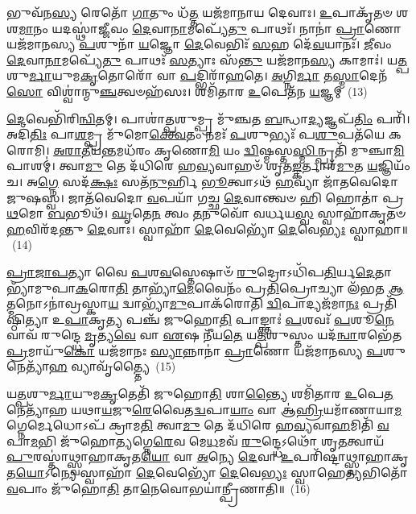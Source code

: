 𑌭𑍁𑌵᳴𑌨\-\ul{𑌸𑍍𑌯} 𑌰𑍇𑌤𑍋᳴ \ul{𑌗𑌾}\-𑌤𑍁𑌂 𑌧᳴\-\ul{𑌤𑍍𑌤} 𑌯𑌜᳴𑌮𑌾𑌨𑌾𑌯 𑌦𑍇𑌵𑌾𑌃। \ul{𑌉}\-𑌪𑌾𑌕𑍃᳴𑌤𑍞 𑌶𑌶\-\ul{𑌮𑌾}\-𑌨𑌂 𑌯𑌦𑌸𑍍𑌥𑌾॑\-\ul{𑌜𑍍𑌜𑍀}\-𑌵𑌂 \ul{𑌦𑍇}\-𑌵𑌾\-\ul{𑌨𑌾}\-𑌮𑌪𑍍𑌯𑍇᳴\-\ul{𑌤𑍁} 𑌪𑌾𑌥𑌃᳴। 𑌨𑌾𑌨𑌾॑ \ul{𑌪𑍍𑌰𑌾}\-𑌣𑍋 𑌯𑌜᳴𑌮𑌾𑌨𑌸𑍍𑌯 \ul{𑌪}\-𑌶𑍁𑌨𑌾᳴ \ul{𑌯}\-𑌜𑍍𑌞𑍋 \ul{𑌦𑍇}\-𑌵𑍇𑌭𑌿𑌃᳴ \ul{𑌸}\-𑌹 𑌦𑍇᳴\-\ul{𑌵}\-𑌯𑌾𑌨𑌃᳴। \ul{𑌜𑍀}\-𑌵𑌂 \ul{𑌦𑍇}\-𑌵𑌾\-\ul{𑌨𑌾}\-𑌮𑌪𑍍𑌯𑍇᳴\-\ul{𑌤𑍁} 𑌪𑌾𑌥𑌃᳴ \ul{𑌸}\-𑌤𑍍𑌯𑌾𑌃 𑌸᳴\-\ul{𑌨𑍍𑌤𑍁} 𑌯𑌜᳴𑌮𑌾𑌨\-\ul{𑌸𑍍𑌯} 𑌕𑌾𑌮𑌾𑌃॑। 𑌯\-\ul{𑌤𑍍𑌪}\-𑌶𑍁\-\ul{𑌰𑍍𑌮𑌾}\-𑌯𑍁𑌮\-\ul{𑌕𑍃}\-𑌤𑍋𑌰𑍋᳴ 𑌵𑌾 \ul{𑌪}\-𑌦𑍍𑌭𑌿𑌰𑌾᳴\-\ul{𑌹}\-𑌤𑍇। \ul{𑌅}\-𑌗𑍍𑌨𑌿\-\ul{𑌰𑍍𑌮𑌾} 𑌤\-\ul{𑌸𑍍𑌮𑌾}\-𑌦𑍇𑌨᳴\-\ul{𑌸𑍋} 𑌵𑌿𑌶𑍍𑌵𑌾॑𑌨𑍍𑌮𑍁\-\ul{𑌞𑍍𑌚}\-𑌤𑍍𑌵𑍞𑌹᳴𑌸𑌃। 𑌶𑌮𑌿᳴𑌤𑌾𑌰 \ul{𑌉}\-𑌪𑍇𑌤᳴𑌨 \ul{𑌯}\-𑌜𑍍𑌞𑌮𑍍~(13)

\-\ul{𑌦𑍇}\-𑌵𑍇𑌭𑌿᳴𑌰𑌿\-\ul{𑌨𑍍𑌵𑌿}\-𑌤𑌮𑍍। 𑌪𑌾𑌶𑌾॑\-\ul{𑌤𑍍𑌪}\-𑌶𑍁𑌮𑍍𑌪𑍍𑌰 𑌮𑍁᳴𑌞𑍍𑌚𑌤 \ul{𑌬}\-𑌨𑍍𑌧𑌾\-\ul{𑌦𑍍𑌯}\-𑌜𑍍𑌞𑌪᳴\-\ul{𑌤𑌿𑌂} 𑌪𑌰𑌿᳴। 𑌅𑌦𑌿᳴\-\ul{𑌤𑌿𑌃} 𑌪𑌾\-\ul{𑌶}\-𑌮𑍍𑌪𑍍𑌰 𑌮𑍁᳴𑌮𑍋\-\ul{𑌕𑍍𑌤𑍍𑌵𑍇}\-𑌤𑌂 𑌨𑌮𑌃᳴ \ul{𑌪}\-𑌶𑍁𑌭𑍍𑌯𑌃᳴ 𑌪\-\ul{𑌶𑍁}\-𑌪𑌤᳴𑌯𑍇 𑌕𑌰𑍋𑌮𑌿। \ul{𑌅}\-\-\ul{𑌰𑌾}\-\-\ul{𑌤𑍀}\-𑌯\-\ul{𑌨𑍍𑌤}\-𑌮𑌧᳴𑌰𑌂 𑌕𑍃𑌣𑍋\-\ul{𑌮𑌿} 𑌯𑌂 \ul{𑌦𑍍𑌵𑌿}\-𑌷𑍍𑌮𑌸𑍍𑌤\-\ul{𑌸𑍍𑌮𑌿}\-𑌨𑍍𑌪𑍍𑌰𑌤𑌿᳴ 𑌮𑍁𑌞𑍍𑌚𑌾\-\ul{𑌮𑌿} 𑌪𑌾𑌶𑌮𑍍॑। 𑌤𑍍𑌵𑌾\-\ul{𑌮𑍁} 𑌤𑍇 𑌦᳴𑌧𑌿𑌰𑍇 𑌹\-\ul{𑌵𑍍𑌯}\-𑌵𑌾𑌹𑍞᳴ 𑌶𑍃𑌤\-\ul{𑌙𑍍𑌕}\-𑌰𑍍𑌤𑌾𑌰᳴\-\ul{𑌮𑍁}\-𑌤 \ul{𑌯}\-𑌜𑍍𑌞𑌿𑌯𑌂᳴ 𑌚। 𑌅\-\ul{𑌗𑍍𑌨𑍇} 𑌸𑌦᳴\-\ul{𑌕𑍍𑌷𑌃} 𑌸𑌤᳴\-\ul{𑌨𑍁}\-𑌰𑍍\mbox{}𑌹𑌿 \ul{𑌭𑍂}\-𑌤𑍍𑌵𑌾\-𑌽𑌥᳴ \ul{𑌹}\-𑌵𑍍𑌯𑌾 𑌜𑌾᳴𑌤𑌵𑍇𑌦𑍋 𑌜𑍁𑌷𑌸𑍍𑌵। 𑌜𑌾𑌤᳴𑌵𑍇𑌦𑍋 \ul{𑌵}\-𑌪𑌯𑌾᳴ 𑌗𑌚𑍍𑌛 \ul{𑌦𑍇}\-𑌵𑌾𑌨𑍍𑌤𑍍𑌵𑍞 𑌹𑌿 𑌹𑍋𑌤𑌾॑ 𑌪𑍍𑌰\-\ul{𑌥}\-𑌮𑍋 \ul{𑌬}\-𑌭𑍂𑌥᳴। \ul{𑌘𑍃}\-𑌤𑍇\-\ul{𑌨} 𑌤𑍍𑌵𑌂 \ul{𑌤}\-𑌨𑍁𑌵𑍋᳴ 𑌵𑌰𑍍𑌧𑌯\-\ul{𑌸𑍍𑌵} 𑌸𑍍𑌵𑌾𑌹𑌾᳴𑌕𑍃𑌤𑍞 \ul{𑌹}\-𑌵𑌿𑌰᳴𑌦𑌨𑍍𑌤𑍁 \ul{𑌦𑍇}\-𑌵𑌾𑌃। 𑌸𑍍𑌵𑌾𑌹𑌾᳴ \ul{𑌦𑍇}\-𑌵𑍇𑌭𑍍𑌯𑍋᳴ \ul{𑌦𑍇}\-𑌵𑍇\-\ul{𑌭𑍍𑌯𑌃} 𑌸𑍍𑌵𑌾𑌹𑌾॑॥~(14)

{\anuvakamend[{𑌈𑌶𑍇॑ 𑌪𑍍𑌰\-\ul{𑌮𑍁}\-𑌞𑍍𑌚𑌮𑌾᳴𑌨𑌾 \ul{𑌯}\-𑌜𑍍𑌞𑌨𑍍𑌤𑍍𑌵𑍞 𑌷𑍋𑌡᳴𑌶 𑌚}]}%

\-\ul{𑌪𑍍𑌰𑌾}\-\-\ul{𑌜𑌾}\-\-\ul{𑌪}\-𑌤𑍍𑌯𑌾 𑌵𑍈 \ul{𑌪}\-𑌶\-\ul{𑌵}\-𑌸𑍍𑌤𑍇𑌷𑌾𑍞᳴ \ul{𑌰𑍁}\-𑌦𑍍𑌰𑍋\-𑌽𑌧𑌿᳴𑌪\-\ul{𑌤𑌿}\-𑌰𑍍𑌯\-\ul{𑌦𑍇}\-𑌤𑌾𑌭𑍍𑌯𑌾᳴𑌮𑍁𑌪𑌾\-\ul{𑌕}\-𑌰𑍋\-\ul{𑌤𑌿} 𑌤𑌾𑌭𑍍𑌯𑌾᳴\-\ul{𑌮𑍇}\-𑌵𑍈𑌨𑌂᳴ 𑌪𑍍𑌰\-\ul{𑌤𑌿}\-𑌪𑍍𑌰𑍋𑌚𑍍𑌯𑌾 𑌲᳴𑌭𑌤 \ul{𑌆}\-𑌤𑍍𑌮𑌨𑍋\-𑌽𑌨𑌾॑𑌵𑍍𑌰𑌸𑍍𑌕𑌾\-\ul{𑌯} 𑌦𑍍𑌵𑌾𑌭𑍍𑌯𑌾᳴\-\ul{𑌮𑍁}\-𑌪𑌾𑌕᳴𑌰𑍋𑌤𑌿 \ul{𑌦𑍍𑌵𑌿}\-𑌪𑌾𑌦𑍍𑌯𑌜᳴𑌮𑌾\-\ul{𑌨𑌃} 𑌪𑍍𑌰𑌤𑌿᳴𑌷𑍍𑌠𑌿𑌤𑍍𑌯𑌾 𑌉\-\ul{𑌪𑌾}\-𑌕𑍃\-\ul{𑌤𑍍𑌯} 𑌪𑌞𑍍𑌚᳴ 𑌜𑍁𑌹𑍋\-\ul{𑌤𑌿} 𑌪𑌾𑌙𑍍𑌕𑍍𑌤𑌾𑌃॑ \ul{𑌪}\-𑌶𑌵𑌃᳴ \ul{𑌪}\-𑌶𑍂\-\ul{𑌨𑍇}\-𑌵𑌾𑌵᳴ 𑌰𑍁𑌨𑍍𑌦𑍍𑌧𑍇 \ul{𑌮𑍃}\-𑌤𑍍𑌯\-\ul{𑌵𑍇} 𑌵𑌾 \ul{𑌏}\-𑌷 𑌨𑍀᳴𑌯\-\ul{𑌤𑍇} 𑌯\-\ul{𑌤𑍍𑌪}\-𑌶𑍁𑌸𑍍𑌤𑌂 𑌯𑌦᳴\-\ul{𑌨𑍍𑌵𑌾}\-𑌰𑌭𑍇᳴𑌤 \ul{𑌪𑍍𑌰}\-𑌮𑌾𑌯𑍁᳴\-\ul{𑌕𑍋} 𑌯𑌜᳴𑌮𑌾𑌨𑌃 \ul{𑌸𑍍𑌯𑌾}\-𑌨𑍍𑌨𑌾𑌨𑌾॑ \ul{𑌪𑍍𑌰𑌾}\-𑌣𑍋 𑌯𑌜᳴𑌮𑌾𑌨𑌸𑍍𑌯 \ul{𑌪}\-𑌶𑍁𑌨𑍇𑌤𑍍𑌯𑌾᳴\-\ul{𑌹} 𑌵𑍍𑌯𑌾𑌵𑍃᳴𑌤𑍍𑌤𑍍𑌯𑍈~(15)

𑌯\-\ul{𑌤𑍍𑌪}\-𑌶𑍁\-\ul{𑌰𑍍𑌮𑌾}\-𑌯𑍁𑌮\-\ul{𑌕𑍃}\-𑌤𑍇𑌤𑌿᳴ 𑌜𑍁𑌹𑍋\-\ul{𑌤𑌿} 𑌶𑌾\-\ul{𑌨𑍍𑌤𑍍𑌯𑍈} 𑌶𑌮𑌿᳴𑌤𑌾𑌰 \ul{𑌉}\-𑌪𑍇\-\ul{𑌤}\-𑌨𑍇𑌤𑍍𑌯𑌾᳴𑌹 𑌯𑌥𑌾\-\ul{𑌯}\-𑌜𑍁\-\ul{𑌰𑍇}\-𑌵𑍈𑌤\-\ul{𑌦𑍍𑌵}\-𑌪𑌾\-\ul{𑌯𑌾𑌂} 𑌵𑌾 𑌆॑\-\ul{𑌹𑍍𑌰𑌿}\-𑌯𑌮𑌾᳴𑌣𑌾𑌯𑌾\-\ul{𑌮}\-𑌗𑍍𑌨𑍇𑌰𑍍𑌮𑍇𑌧𑍋\-𑌽𑌪᳴ 𑌕𑍍𑌰𑌾𑌮\-\ul{𑌤𑌿} 𑌤𑍍𑌵𑌾\-\ul{𑌮𑍁} 𑌤𑍇 𑌦᳴𑌧𑌿𑌰𑍇 𑌹\-\ul{𑌵𑍍𑌯}\-𑌵𑌾\-\ul{𑌹}\-𑌮𑌿𑌤𑌿᳴ \ul{𑌵}\-𑌪𑌾\-\ul{𑌮}\-𑌭𑌿 𑌜𑍁᳴𑌹𑍋\-\ul{𑌤𑍍𑌯}\-𑌗𑍍𑌨𑍇\-\ul{𑌰𑍇}\-𑌵 𑌮𑍇\-\ul{𑌧}\-𑌮𑌵᳴ \ul{𑌰𑍁}\-𑌨𑍍𑌦𑍍𑌧𑍇\-𑌽𑌥𑍋᳴ 𑌶𑍃\-\ul{𑌤}\-𑌤𑍍𑌵𑌾𑌯᳴ \ul{𑌪𑍁}\-𑌰𑌸𑍍𑌤𑌾॑𑌥𑍍𑌸𑍍𑌵𑌾𑌹𑌾𑌕𑍃𑌤\-\ul{𑌯𑍋} 𑌵𑌾 \ul{𑌅}\-𑌨𑍍𑌯𑍇 \ul{𑌦𑍇}\-𑌵𑌾 \ul{𑌉}\-𑌪𑌰𑌿᳴𑌷𑍍𑌟𑌾𑌥𑍍𑌸𑍍𑌵𑌾𑌹𑌾𑌕𑍃𑌤\-\ul{𑌯𑍋}\-\-𑌽𑌨𑍍𑌯𑍇 𑌸𑍍𑌵𑌾𑌹𑌾᳴ \ul{𑌦𑍇}\-𑌵𑍇𑌭𑍍𑌯𑍋᳴ \ul{𑌦𑍇}\-𑌵𑍇\-\ul{𑌭𑍍𑌯𑌃} 𑌸𑍍𑌵𑌾𑌹𑍇\-\ul{𑌤𑍍𑌯}\-𑌭𑌿𑌤𑍋᳴ \ul{𑌵}\-𑌪𑌾𑌂 𑌜𑍁᳴𑌹𑍋\-\ul{𑌤𑌿} 𑌤𑌾\-\ul{𑌨𑍇}\-𑌵𑍋𑌭𑌯𑌾॑𑌨𑍍𑌪𑍍𑌰𑍀𑌣𑌾𑌤𑌿॥~(16)

